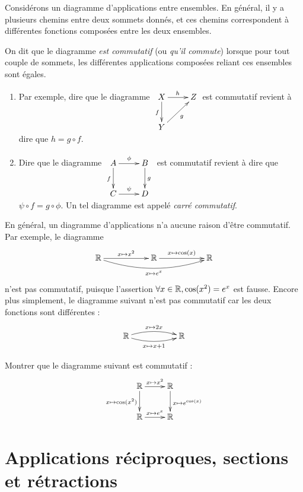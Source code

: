 \begin{definition}
Considérons un diagramme d'applications entre ensembles. En général, il y a plusieurs chemins entre deux sommets donnés, et ces chemins correspondent à différentes fonctions composées entre les deux ensembles.

On dit que le diagramme \emph{est commutatif} (ou \emph{qu'il commute}) lorsque pour tout couple de sommets, les différentes applications composées reliant ces ensembles sont égales.
\end{definition}

\begin{exemple}
\begin{enumerate}
\item  Par exemple, dire que le diagramme
$
\xymatrix{
X \ar[d]_{f} \ar[r]^{h}& Z \\
Y \ar[ur]_{g}& 
}
$
est commutatif revient à dire que $h = g\circ f$.
\item Dire que le diagramme 
$\xymatrix{
A \ar[r]^{\phi} \ar[d]_{f} & B \ar[d]^{g}\\
C \ar[r]^{\psi}& D 
}$
est commutatif revient à dire que $\psi\circ f = g \circ \phi$. Un tel diagramme est appelé \emph{carré commutatif}.
\end{enumerate}
\end{exemple}

\begin{attention}
En général, un diagramme d'applications n'a aucune raison d'être commutatif.
Par exemple, le diagramme
\[\xymatrix{
\R \ar[rr]^{x\mapsto x^2} \ar@/_1pc/[rrrr]_{x\mapsto e^x}  & & \R \ar[rr]^{x\mapsto \cos(x)} & & \R
}\]
n'est pas commutatif, puisque l'assertion \og $\forall x\in \mathbb{R}, \cos(x^2)=e^{x}$\fg{} est fausse. Encore plus simplement, le diagramme suivant n'est pas commutatif car les deux fonctions sont différentes :
\[\xymatrix{
\R \ar@/^/[rr]^{x\mapsto 2x} \ar@/_/[rr]_{x\mapsto x+1} & & \R
}\]
\end{attention}

\begin{exercice} Montrer que le diagramme suivant est commutatif :
\[\xymatrix{
\R  \ar[r]^{x\mapsto x^2} \ar[d]_{x\mapsto \cos(x^2)} & \R  \ar[d]^{x\mapsto e^{\cos(x)}}\\
\R  \ar[r]^{x\mapsto e^x}& \R 
}\]
\end{exercice}




\section{Applications réciproques, sections et rétractions}

